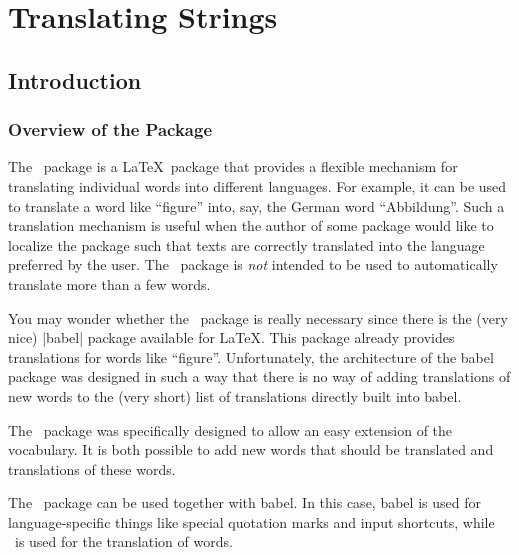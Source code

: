 %
%
%

\section{Translating Strings}

\subsection{Introduction}

\subsubsection{Overview of the Package}

The \translatorname\ package is a \LaTeX\ package that provides a flexible mechanism for translating individual words into different languages. For example, it can be used to translate a word like ``figure'' into, say, the German word ``Abbildung''. Such a translation mechanism is useful when the author of some package would like to localize the package such that texts are correctly translated into the language preferred by the user. The \translatorname\ package is \emph{not} intended to be used to automatically translate more than a few words.

You may wonder whether the \translatorname\ package is really necessary since there is the (very nice) |babel| package available for \LaTeX. This package already provides translations for words like ``figure''. Unfortunately, the architecture of the babel package was designed in such a way that there is no way of adding translations of new words to the (very short) list of translations directly built into babel.

The \translatorname\ package was specifically designed to allow an easy extension of the vocabulary. It is both possible to add new words that should be translated and translations of these words.

The \translatorname\ package can be used together with babel. In this case, babel is used for language-specific things like special quotation marks and input shortcuts, while \translatorname\ is used for the translation of words.


